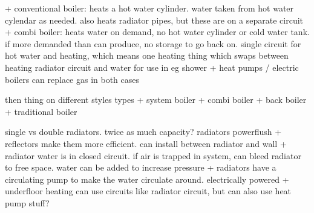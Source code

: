 + conventional boiler: heats a hot water cylinder. water taken from hot water cylendar as needed. also heats radiator pipes, but these are on a separate circuit
+ combi boiler: heats water on demand, no hot water cylinder or cold water tank. if more demanded than can produce, no storage to go back on. single circuit for hot water and heating, which means one heating thing which swaps between heating radiator circuit and water for use in eg shower
+ heat pumps / electric boilers can replace gas in both cases

then thing on different styles types
+ system boiler
+ combi boiler
+ back boiler
+ traditional boiler

single vs double radiators. twice as much capacity?
radiators
powerflush
+ reflectors make them more efficient. can install between radiator and wall
+ radiator water is in closed circuit. if air is trapped in system, can bleed radiator to free space. water can be added to increase pressure
+ radiators have a circulating pump to make the water circulate around. electrically powered
+ underfloor heating can use circuits like radiator circuit, but can also use heat pump stuff?


